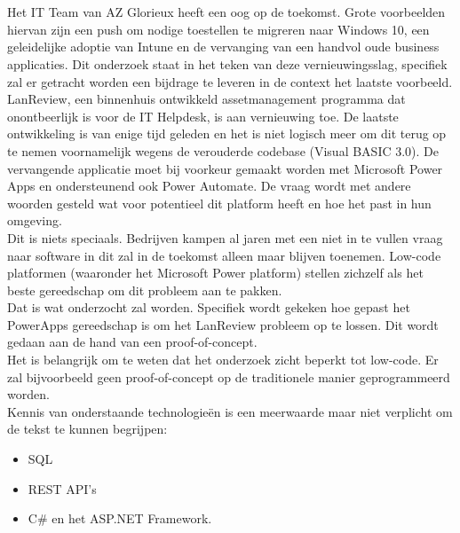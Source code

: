 
\chapter{}
\label{ch:inleiding}

Het IT Team van AZ Glorieux heeft een oog op de toekomst. Grote voorbeelden hiervan zijn een push om nodige toestellen te migreren naar Windows 10, een geleidelijke adoptie van Intune en de vervanging van een handvol oude business applicaties. Dit onderzoek staat in het teken van deze vernieuwingsslag, specifiek zal er getracht worden een bijdrage te leveren in de context het laatste voorbeeld.\\
LanReview, een binnenhuis ontwikkeld assetmanagement programma dat onontbeerlijk is voor de IT Helpdesk, is aan vernieuwing toe. De laatste ontwikkeling is van enige tijd geleden en het is niet logisch meer om dit terug op te nemen voornamelijk wegens de verouderde codebase (Visual BASIC 3.0). De vervangende applicatie moet bij voorkeur gemaakt worden met Microsoft Power Apps en ondersteunend ook Power Automate. De vraag wordt met andere woorden gesteld wat voor potentieel dit platform heeft en hoe het past in hun omgeving.\\
Dit is niets speciaals. Bedrijven kampen al jaren met een niet in te vullen vraag naar software in dit zal in de toekomst alleen maar blijven toenemen. Low-code platformen (waaronder het Microsoft Power platform) stellen zichzelf als het beste gereedschap om dit probleem aan te pakken.\\
Dat is wat onderzocht zal worden. Specifiek wordt gekeken hoe gepast het PowerApps gereedschap is om het LanReview probleem op te lossen. Dit wordt gedaan aan de hand van een proof-of-concept.\\
Het is belangrijk om te weten dat het onderzoek zicht beperkt tot low-code. Er zal bijvoorbeeld geen proof-of-concept op de traditionele manier geprogrammeerd worden.\\
Kennis van onderstaande technologieën is een meerwaarde maar niet verplicht om de tekst te kunnen begrijpen:
\begin{itemize}
    \item SQL
    \item REST API's
    \item C\# en het ASP.NET Framework.
\end{itemize}

